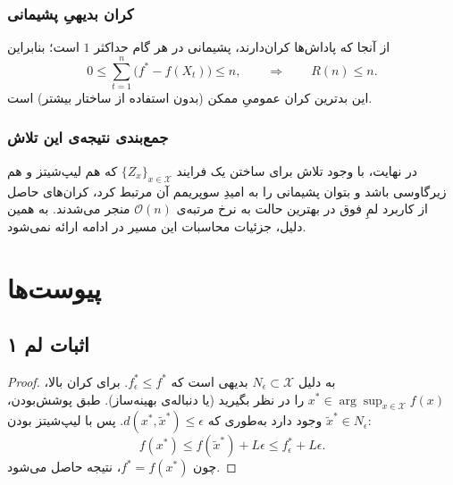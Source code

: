 \documentclass[a4paper,10pt,twocolumn]{article}
\begin{document}
\subsubsection{کران بدیهیِ پشیمانی}
از آنجا که پاداش‌ها کران‌دارند، پشیمانی در هر گام حداکثر $1$ است؛ بنابراین
\[
0\le \sum_{t=1}^n \bigl(f^\ast-f(X_t)\bigr)\le n,
\qquad\Rightarrow\qquad
R(n) \le n.
\]
این بدترین کران عمومیِ ممکن (بدون استفاده از ساختار بیشتر) است.

\subsubsection{جمع‌بندی نتیجه‌ی این تلاش}
در نهایت، با وجود تلاش برای ساختن یک فرایند $\{Z_x\}_{x\in\mathcal{X}}$ که هم لیپ‌شیتز و هم زیرگاوسی باشد
و بتوان پشیمانی را به امیدِ سوپریمم آن مرتبط کرد، کران‌های حاصل از کاربرد لمِ فوق
در بهترین حالت به نرخ مرتبه‌ی $\mathcal{O}(n)$ منجر می‌شدند.
به همین دلیل، جزئیات محاسبات این مسیر در ادامه ارائه نمی‌شود.






\appendix
\section*{پیوست‌ها}

\renewcommand{\thesection}{\Alph{section}}

\subsection*{اثبات لم ۱}
\begin{proof}
به دلیل $N_\epsilon\subset\mathcal{X}$ بدیهی است که $f^\ast_\epsilon\le f^\ast$.
برای کران بالا، $x^\ast\in\arg\sup_{x\in\mathcal{X}} f(x)$ را در نظر بگیرید (یا دنباله‌ی بهینه‌ساز).
طبق پوشش‌بودن، $\tilde x^\ast\in N_\epsilon$ وجود دارد به‌طوری که $d(x^\ast,\tilde x^\ast)\le\epsilon$.
پس با لیپ‌شیتز بودن:
\[
f(x^\ast)\le f(\tilde x^\ast)+L\epsilon \le f^\ast_\epsilon + L\epsilon.
\]
چون $f^\ast=f(x^\ast)$، نتیجه حاصل می‌شود.
\end{proof}
\end{document}
